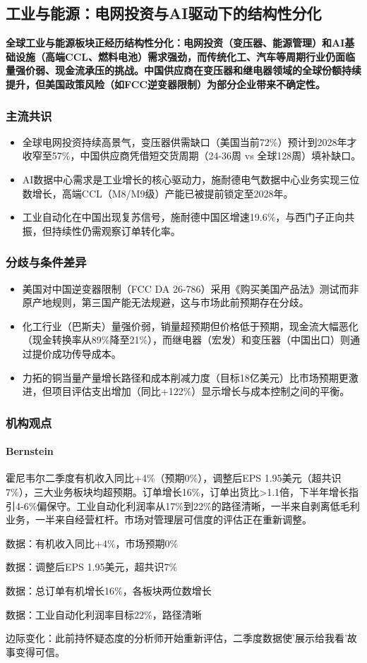 \documentclass[11pt]{ctexart}
\begin{document}
\subsection{工业与能源：电网投资与AI驱动下的结构性分化}
\textbf{全球工业与能源板块正经历结构性分化：电网投资（变压器、能源管理）和AI基础设施（高端CCL、燃料电池）需求强劲，而传统化工、汽车等周期行业仍面临量强价弱、现金流承压的挑战。中国供应商在变压器和继电器领域的全球份额持续提升，但美国政策风险（如FCC逆变器限制）为部分企业带来不确定性。}
\subsubsection*{主流共识}
\begin{itemize}
  \item 全球电网投资持续高景气，变压器供需缺口（美国当前72\%）预计到2028年才收窄至57\%，中国供应商凭借短交货周期（24-36周 vs 全球128周）填补缺口。
  \item AI数据中心需求是工业增长的核心驱动力，施耐德电气数据中心业务实现三位数增长，高端CCL（M8/M9级）产能已被提前锁定至2028年。
  \item 工业自动化在中国出现复苏信号，施耐德中国区增速19.6\%，与西门子正向共振，但持续性仍需观察订单转化率。
\end{itemize}
\subsubsection*{分歧与条件差异}
\begin{itemize}
  \item 美国对中国逆变器限制（FCC DA 26-786）采用《购买美国产品法》测试而非原产地规则，第三国产能无法规避，这与市场此前预期存在分歧。
  \item 化工行业（巴斯夫）量强价弱，销量超预期但价格低于预期，现金流大幅恶化（现金转换率从89\%降至21\%），而继电器（宏发）和变压器（中国出口）则通过提价成功传导成本。
  \item 力拓的铜当量产量增长路径和成本削减力度（目标18亿美元）比市场预期更激进，但项目评估支出增加（同比+122\%）显示增长与成本控制之间的平衡。
\end{itemize}
\subsubsection*{机构观点}
\paragraph{Bernstein} 霍尼韦尔二季度有机收入同比+4\%（预期0\%），调整后EPS 1.95美元（超共识7\%），三大业务板块均超预期。订单增长16\%，订单出货比>1.1倍，下半年增长指引4-6\%偏保守。工业自动化利润率从17\%到22\%的路径清晰，一半来自剥离低毛利业务，一半来自经营杠杆。市场对管理层可信度的评估正在重新调整。
{\small\color{refgray}数据：有机收入同比+4\%，市场预期0\%\par}
{\small\color{refgray}数据：调整后EPS 1.95美元，超共识7\%\par}
{\small\color{refgray}数据：总订单有机增长16\%，各板块两位数增长\par}
{\small\color{refgray}数据：工业自动化利润率目标22\%，路径清晰\par}
{\small\color{refgray}边际变化：此前持怀疑态度的分析师开始重新评估，二季度数据使'展示给我看'故事变得可信。\par}
\end{document}
